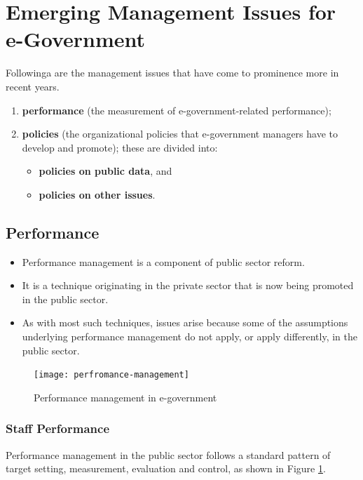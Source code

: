 

\section{Emerging Management Issues for e-Government}

Followinga are the management issues that have come to prominence more in recent years. 
\begin{enumerate}
	\item \textbf{performance} (the measurement of e-government-related performance);
	\item \textbf{policies} (the organizational policies that e-government managers have to develop	and promote); these are divided into:
	\begin{itemize}
		\item \textbf{policies on public data}, and 
		\item \textbf{policies on	other issues}.
	\end{itemize}
	 
\end{enumerate}

 \subsection{Performance}
 \begin{itemize}
 	\item Performance management is a component of public sector reform. 
 	\item It is a technique originating in the private sector that is now being promoted in the public sector. 
 	\item As with most such techniques, issues arise because some of the assumptions underlying performance management do not apply, or apply differently, in the public sector.
 \end{itemize}

\begin{figure}[ht!]
	\centering
	\texttt{[image: perfromance-management]}
	\caption{Performance management in e-government}
	\label{fig:perfromance-management}
\end{figure}

\subsubsection{Staff Performance}
Performance management in the public sector follows a standard pattern of target
setting, measurement, evaluation and control, as shown in Figure \ref{fig:perfromance-management}.


